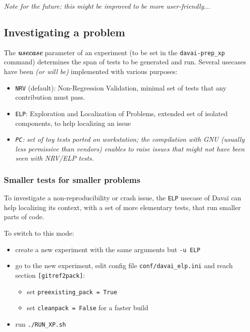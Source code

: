 \documentclass[a4paper,10pt,twoside]{article}
\begin{document}
\textit{Note for the future: this might be improved to be more user-friendly...}



\subsection{\label{sect:investigating}Investigating a problem}

The \textit{\textbf{usecase}} parameter of an experiment (to be set in the \texttt{davai-prep\_xp} command) determines the span of tests to be generated and run. Several usecases have been \textit{(or will be)} implemented with various purposes:
  \begin{itemize}
   \item \texttt{NRV} (default): Non-Regression Validation, minimal set of tests that any contribution must pass.
   \item \texttt{ELP}: Exploration and Localization of Problems, extended set of isolated components, to help localizing an issue
   \item \textit{\texttt{PC}: set of toy tests ported on workstation; the compilation with GNU (usually less permissive than vendors) enables to raise issues that might not have been seen with NRV/ELP tests.}
  \end{itemize}

\subsubsection*{Smaller tests for smaller problems}

To investigate a non-reproducibility or crash issue, the \texttt{ELP} usecase of Davaï can help localizing its context, with a set of more elementary tests, that run smaller parts of code.

\noindent To switch to this mode:
\begin{itemize}
 \item create a new experiment with the same arguments but \texttt{-u ELP}
 \item go to the new experiment, edit config file \texttt{conf/davai\_elp.ini} and reach section \texttt{[gitref2pack]}:
 \begin{itemize}
  \item set \texttt{preexisting\_pack = True}
  \item set \texttt{cleanpack = False} for a faster build
 \end{itemize}
 \item run \texttt{./RUN\_XP.sh}
\end{itemize}
\end{document}
